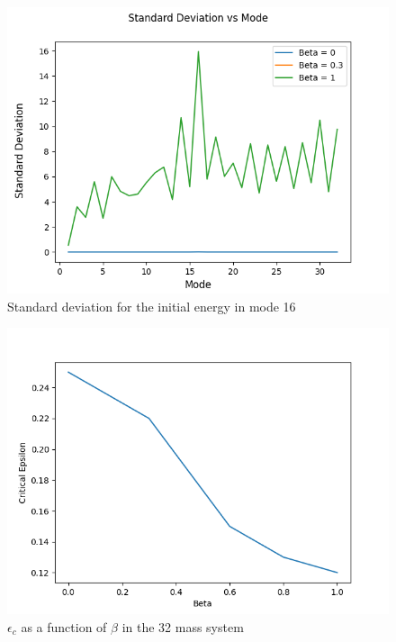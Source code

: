 \documentclass[pra,twocolumn,showpacs,amsmath,amssymb]{revtex4-2}
\begin{document}
\begin{figure}[t!]
\includegraphics[scale=0.50]{Dev_Betas_16.png}
\caption{Standard deviation for the initial energy in mode 16}\label{position}
\end{figure}

\begin{figure}[t!]
\includegraphics[scale=0.50]{Epsc.png}
\caption{$\epsilon_c$ as a function of $\beta$ in the 32 mass system}\label{position}
\end{figure}
\end{document}
